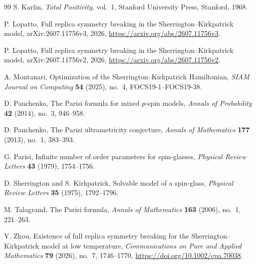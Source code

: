 \documentclass[10pt]{amsart}
\theoremstyle{definition}
\theoremstyle{remark}
\numberwithin{equation}{section}
\newcommand{\1}{\mathbf 1}
\begin{document}
\begin{thebibliography}{99}
S. Karlin,
\newblock \emph{Total Positivity}, vol.~1,
\newblock Stanford University Press, Stanford, 1968.

P. Lopatto,
\newblock Full replica symmetry breaking in the Sherrington--Kirkpatrick model,
\newblock arXiv:2607.11756v3, 2026,
\newblock \url{https://arxiv.org/abs/2607.11756v3}.

P. Lopatto,
\newblock Full replica symmetry breaking in the Sherrington--Kirkpatrick model,
\newblock arXiv:2607.11756v2, 2026,
\newblock \url{https://arxiv.org/abs/2607.11756v2}.

A. Montanari,
\newblock Optimization of the Sherrington--Kirkpatrick Hamiltonian,
\newblock \emph{SIAM Journal on Computing} \textbf{54} (2025), no.~4, FOCS19-1--FOCS19-38.

D. Panchenko,
\newblock The Parisi formula for mixed $p$-spin models,
\newblock \emph{Annals of Probability} \textbf{42} (2014), no.~3, 946--958.

D. Panchenko,
\newblock The Parisi ultrametricity conjecture,
\newblock \emph{Annals of Mathematics} \textbf{177} (2013), no.~1, 383--393.

G. Parisi,
\newblock Infinite number of order parameters for spin-glasses,
\newblock \emph{Physical Review Letters} \textbf{43} (1979), 1754--1756.

D. Sherrington and S. Kirkpatrick,
\newblock Solvable model of a spin-glass,
\newblock \emph{Physical Review Letters} \textbf{35} (1975), 1792--1796.

M. Talagrand,
\newblock The Parisi formula,
\newblock \emph{Annals of Mathematics} \textbf{163} (2006), no.~1, 221--263.

Y. Zhou,
\newblock Existence of full replica symmetry breaking for the Sherrington--Kirkpatrick model at low temperature,
\newblock \emph{Communications on Pure and Applied Mathematics} \textbf{79} (2026), no.~7, 1746--1770,
\newblock \url{https://doi.org/10.1002/cpa.70038}.

\end{thebibliography}
\end{document}
